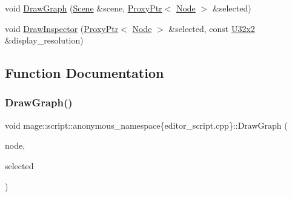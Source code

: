 \begin{DoxyCompactItemize}
\item 
void \mbox{\hyperlink{namespacemage_1_1script_1_1anonymous__namespace_02editor__script_8cpp_03_acfa5e5aa3ba0f36f5647ba6ba6c2a222}{Draw\+Graph}} (\mbox{\hyperlink{classmage_1_1_scene}{Scene}} \&scene, \mbox{\hyperlink{classmage_1_1_proxy_ptr}{Proxy\+Ptr}}$<$ \mbox{\hyperlink{classmage_1_1_node}{Node}} $>$ \&selected)
\item 
void \mbox{\hyperlink{namespacemage_1_1script_1_1anonymous__namespace_02editor__script_8cpp_03_a37f3c01e5f19bd2d536d7caa82c3d3ed}{Draw\+Inspector}} (\mbox{\hyperlink{classmage_1_1_proxy_ptr}{Proxy\+Ptr}}$<$ \mbox{\hyperlink{classmage_1_1_node}{Node}} $>$ \&selected, const \mbox{\hyperlink{namespacemage_ae5e7ccf8a1785baaacf57b3a0f4324e2}{U32x2}} \&display\+\_\+resolution)
\end{DoxyCompactItemize}


\subsection{Function Documentation}
\mbox{\label{namespacemage_1_1script_1_1anonymous__namespace_02editor__script_8cpp_03_a0e1c1d61b369a6c6eee68380890d5217}} 
\subsubsection{\texorpdfstring{Draw\+Graph()}{DrawGraph()}\hspace{0.1cm}{\footnotesize\ttfamily [1/2]}}
{\footnotesize\ttfamily void mage\+::script\+::anonymous\+\_\+namespace\{editor\+\_\+script.\+cpp\}\+::Draw\+Graph (\begin{DoxyParamCaption}\item[{\mbox{\hyperlink{classmage_1_1_node}{Node}} \&}]{node,  }\item[{\mbox{\hyperlink{classmage_1_1_proxy_ptr}{Proxy\+Ptr}}$<$ \mbox{\hyperlink{classmage_1_1_node}{Node}} $>$ \&}]{selected }\end{DoxyParamCaption})}

